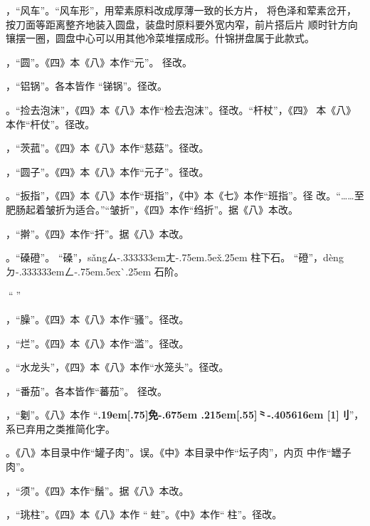 ，“风车”。“风车形”，用荤素原料改成厚薄一致的长方片，
将色泽和荤素岔开，按刀面等距离整齐地装入圆盘，装盘时原料要外宽内窄，前片搭后片
顺时针方向镶摆一圈，圆盘中心可以用其他冷菜堆摆成形。什锦拼盘属于此款式。

，“圆”。《四》本《八》本作“元”。
径改。

，“铝锅”。各本皆作
“锑锅”。径改。

。“捡去泡沫”，《四》本《八》本作“检去泡沫”。径改。“杆杖”，《四》
本《八》本作“杆仗”。径改。

，“茨菰”。《四》本《八》本作“慈菇”。径改。

，“圆子”。《四》本《八》本作“元子”。径改。

。“扳指”，《四》本《八》本作“斑指”，《中》本《七》本作“班指”。径
改。“……至肥肠起着皱折为适合。”“皱折”，《四》本作“绉折”。据《八》本改。

，“擀”。《四》本作“扞”。据《八》本改。

。“磉磴”。
“磉”，{s\v{a}ng}{ㄙ\kern-.333333emㄤ\kern-.75em\raise.5ex\hbox{\v{}}\kern.25em}
柱下石。
“磴”，{d\`{e}ng}{ㄉ\kern-.333333emㄥ\kern-.75em\raise.5ex\hbox{\`{}}\kern.25em}
石阶。

，“𠟤”。疑误。

，“臊”。《四》本《八》本作“骚”。径改。

，“烂”。《四》本《八》本作“滥”。径改。

。“水龙头”，《四》本《八》本作“水笼头”。径改。

，“番茄”。各本皆作“蕃茄”。
径改。

，“劖”。《八》本作
“{\bfseries\raise.19em\hbox{\scalebox{.675}[.75]{免}}\kern-.675em%
\lower.215em\hbox{\scalebox{.95}[.55]{⺀}}\kern-.405616em%
\scalebox{.65}[1]{刂}}”，系已弃用之类推简化字。

。《八》本目录中作“罐子肉”。误。《中》本目录中作“坛子肉”，内页
中作“罎子肉”。

，“须”。《四》本作“鬚”。据《八》本改。

，“珧柱”。《四》本《八》本作
“𧎼蛀”。《中》本作“𧎼柱”。径改。

